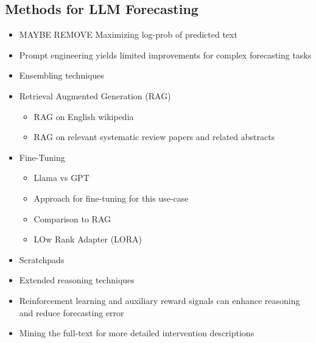 \documentclass[12pt,a4paper]{article}
\begin{document}
\subsection*{Methods for LLM Forecasting}
\begin{itemize}
  \item MAYBE REMOVE Maximizing log-prob of predicted text  
  \item Prompt engineering yields limited improvements for complex forecasting tasks 
  \item Ensembling techniques 
  \item Retrieval Augmented Generation (RAG)
  \begin{itemize}
  \item RAG on English wikipedia
  \item RAG on relevant systematic review papers and related abstracts 
  \end{itemize}
  \item Fine-Tuning
  \begin{itemize}
    \item Llama vs GPT
    \item Approach for fine-tuning for this use-case
    \item Comparison to RAG
    \item LOw Rank Adapter (LORA)
  \end{itemize}
  \item Scratchpads
  \item Extended reasoning techniques
  \item Reinforcement learning and auxiliary reward signals can enhance reasoning and reduce forecasting error 
  \item Mining the full-text for more detailed intervention descriptions 
\end{itemize}
\end{document}
